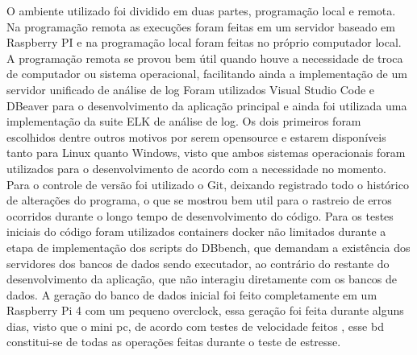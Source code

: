 \documentclass[
	12pt,				%
	openright,			%
	oneside,			%
	a4paper,			%
	english,			%
	french,				%
	spanish,			%
	brazil,				%
	]{abntex2}
\begin{document}
O ambiente utilizado foi dividido em duas partes, programação local e remota. Na programação remota as execuções foram feitas em um servidor baseado em Raspberry PI e na programação local foram feitas no próprio computador local.
A programação remota se provou bem útil quando houve a necessidade de troca de computador ou sistema operacional, facilitando ainda a implementação de um servidor unificado de análise de log\newline
Foram utilizados Visual Studio Code e DBeaver para o desenvolvimento da aplicação principal e ainda foi utilizada uma implementação da suite ELK  de análise de log.
Os dois primeiros foram escolhidos dentre outros motivos por serem opensource e estarem disponíveis tanto para Linux quanto Windows,
visto que ambos sistemas operacionais foram utilizados para o desenvolvimento de acordo com a necessidade no momento.\newline
Para o controle de versão foi utilizado o Git, deixando registrado todo o histórico de alterações do programa,
o que se mostrou bem util para o rastreio de erros ocorridos durante o longo tempo de desenvolvimento do código.\newline
Para os testes iniciais do código foram utilizados containers docker não limitados durante a etapa de implementação dos scripts do DBbench,
que demandam a existência dos servidores dos bancos de dados sendo executador,
ao contrário do restante do desenvolvimento da aplicação, que não interagiu diretamente com os bancos de dados.\newline
A geração do banco de dados inicial foi feito completamente em um Raspberry Pi 4 com um pequeno overclock,
essa geração foi feita durante alguns dias, visto que o mini pc, de acordo com testes de velocidade feitos ,
esse bd constitui-se de todas as operações feitas durante o teste de estresse.
\end{document}
